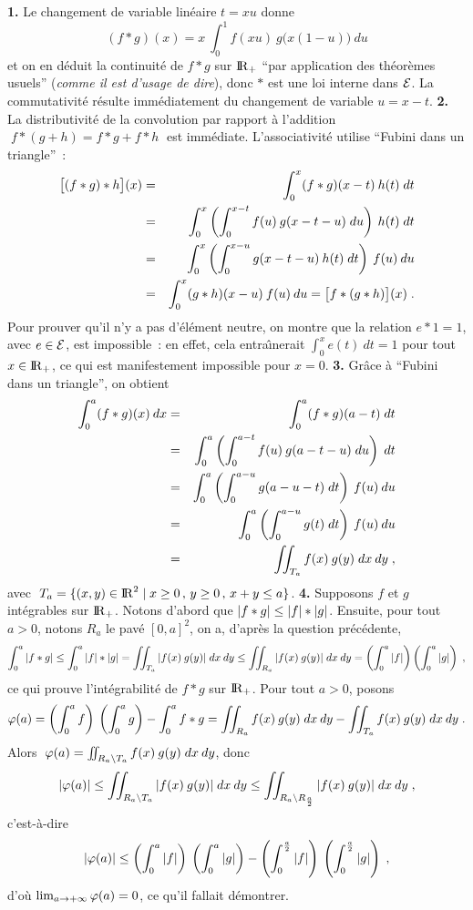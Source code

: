 \documentclass{article}
\begin{document}
{\bf 1.} Le changement de variable lin\'eaire $t=xu$ donne\vv $$(f*g)(x)=x\>\int_0^1f(xu)\>g\big(x(1-u)\big)\>du$$ 
et on en d\'eduit la continuit\'e de $f*g$ sur ${\rm I\kern-0.6mm R}_+$ ``par application des th\'eor\`emes usuels'' ({\it comme il est d'usage de dire}),
donc $*$ est une loi interne dans ${\cal E}$.
La commutativit\'e r\'esulte imm\'ediatement du changement de variable $u=x-t$.\msk
{\bf 2.} La distributivit\'e de la convolution par rapport \`a l'addition
$\;f*(g+h)=f*g+f*h\;$ est imm\'ediate.\ssk\sect
L'associativit\'e
utilise ``Fubini dans un triangle''~:\vv
\begin{eqnarray*}
\big[(f*g)*h\big](x) & = & \int_0^x(f*g)(x-t)\>h(t)\;dt\\
                                & = & \int_0^x\left(\int_0^{x-t}f(u)\>
                                       g(x-t-u)\;du\right)\>h(t)\;dt\\
                                & = & \int_0^x\left(\int_0^{x-u}
                                       g(x-t-u)\>h(t)\;dt\right)\>f(u)\>du\\
                                & = & \int_0^x(g*h)(x-u)\>f(u)\>du = \big[f*(g*h)\big](x)\;.
\end{eqnarray*}
Pour prouver qu'il n'y a
pas d'\'el\'ement neutre, on montre que la relation $e*1=1$, avec $e\in{\cal E}$, est impossible~: en effet, cela entra\^\i nerait $\int_0^xe(t)\>dt=1$ pour tout $x\in{\rm I\kern-0.6mm R}_+$, ce qui est manifestement impossible pour $x=0$.
\msk
{\bf 3.} Gr\^ace \`a ``Fubini dans un triangle'', on obtient\vv
\begin{eqnarray*}
\int_0^a (f*g)(x)\>dx & = & \int_0^a(f*g)(a-t)\;dt\\
                                & = & \int_0^a\left(\int_0^{a-t}f(u)\>
                                       g(a-t-u)\;du\right)\;dt\\
                                & = & \int_0^a\left(\int_0^{a-u}
                                       g(a-u-t)\;dt\right)\>f(u)\>du\\
                                & = & \int_0^a\left(\int_0^{a-u}
                                       g(t)\;dt\right)\>f(u)\>du\\
                                & = & \int\!\!\!\int_{T_a}f(x)\>g(y)\;dx\>dy\;,
\end{eqnarray*}
avec $\;T_a=\{(x,y)\in{\rm I\kern-0.6mm R}^2\;|\;x\ge0\,,\,y\ge0\,,\,x+y\le a\}$.\msk
{\bf 4.} Supposons $f$ et $g$ int\'egrables sur ${\rm I\kern-0.6mm R}_+$. Notons d'abord que $|f*g|\leq|f|*|g|$. Ensuite, pour tout $a>0$, notons $R_a$ le pav\'e $[0,a]^2$, on a, d'apr\`es la question pr\'ec\'edente,\vv
$$\int_0^a|f*g|\leq\int_0^a|f|*|g|=\int\!\!\!\int_{T_a}|f(x)\>g(y)|\;dx\>dy\leq\int\!\!\!\int_{R_a}|f(x)\>g(y)|\;dx\>dy=\left(\int_0^a|f|\right)\left(\int_0^a|g|\right)\;,$$
ce qui prouve l'int\'egrabilit\'e de $f*g$ sur ${\rm I\kern-0.6mm R}_+$.\msk\sect
Pour tout $a>0$, posons\vv
$$\varphi(a)=\left(\int_0^af\right)\>\left(\int_0^ag\right)-\int_0^af*g=\int\!\!\!\int_{R_a}f(x)\>g(y)\;dx\>dy-\int\!\!\!\int_{T_a}f(x)\>g(y)\;dx\>dy\;.$$
Alors $\;\varphi(a)=\int\!\!\!\int_{R_a\setminus T_a}f(x)\>g(y)\;dx\>dy$, donc $$|\ffi(a)|\ie\intd_{R_a\setminus T_a}|f(x)\>g(y)|\;dx\>dy\ie\intd_{R_a\setminus R_{a\sur 2}}|f(x)\>g(y)|\;dx\>dy\;,$$
c'est-\`a-dire\vv
$$|\ffi(a)|\le\lp\int_0^a|f|\rp\>\lp\int_0^a|g|\rp-\lp\int_0^{a\sur2}|f|\rp\>
  \lp\int_0^{a\sur2}|g|\rp\;,$$
d'o\`u $\lim_{a\rightarrow+\infty}\varphi(a)=0$, ce qu'il fallait d\'emontrer.
\end{document}
